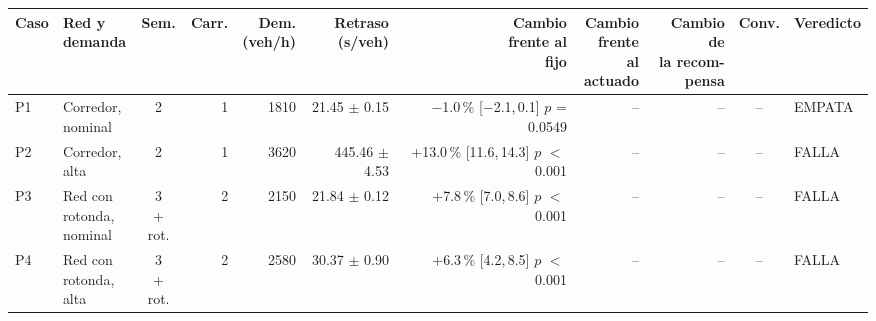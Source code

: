 \begin{table}[H]
\centering
\scriptsize
\setlength{\tabcolsep}{1.5pt}
\begin{tabular}{llcrrrrrrcl}
\toprule
Caso & \makecell[l]{Red y\\demanda} & Sem. & Carr. & \makecell{Dem.\\(veh/h)} & \makecell{Retraso\\(s/veh)} & \makecell{Cambio\\frente al\\fijo} & \makecell{Cambio\\frente al\\actuado} & \makecell{Cambio de\\la recom-\\pensa} & Conv. & Veredicto \\
\midrule
P1 & \makecell[l]{Corredor,\\{}nominal} & 2 & 1 & 1810 & \makecell[r]{21.45\\{}$\pm$ 0.15} & \makecell[r]{$-$1.0\,\%\\{}[$-$2.1,\,0.1]\\$p$ = 0.0549} & -- & -- & -- & EMPATA \\
P2 & \makecell[l]{Corredor,\\{}alta} & 2 & 1 & 3620 & \makecell[r]{445.46\\{}$\pm$ 4.53} & \makecell[r]{+13.0\,\%\\{}[11.6,\,14.3]\\$p$ $<$\,0.001} & -- & -- & -- & FALLA \\
P3 & \makecell[l]{Red con\\{}rotonda,\\{}nominal} & \makecell[c]{3\\{}+ rot.} & 2 & 2150 & \makecell[r]{21.84\\{}$\pm$ 0.12} & \makecell[r]{+7.8\,\%\\{}[7.0,\,8.6]\\$p$ $<$\,0.001} & -- & -- & -- & FALLA \\
P4 & \makecell[l]{Red con\\{}rotonda,\\{}alta} & \makecell[c]{3\\{}+ rot.} & 2 & 2580 & \makecell[r]{30.37\\{}$\pm$ 0.90} & \makecell[r]{+6.3\,\%\\{}[4.2,\,8.5]\\$p$ $<$\,0.001} & -- & -- & -- & FALLA \\

\end{tabular}
\end{table}
